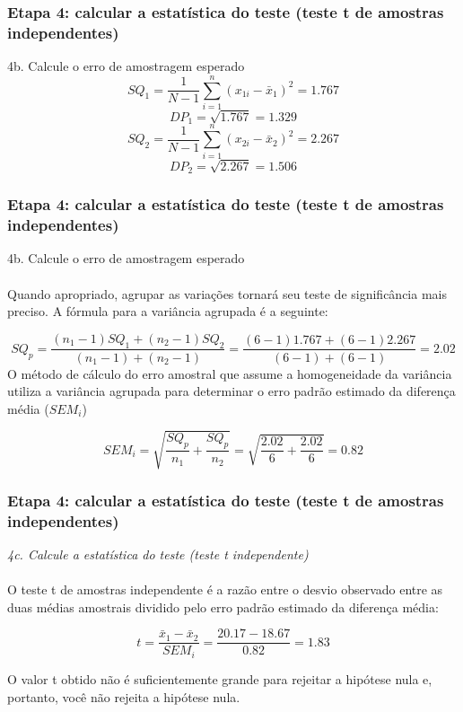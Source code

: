 \documentclass[11pt]{beamer}
\begin{document}
\begin{frame}
\frametitle{Etapa 4: calcular a estatística do teste (teste t de amostras independentes)}
4b. Calcule o erro de amostragem esperado
\[SQ_1 = \frac{1}{N-1}\sum_{i=1}^n(x_{1i} - \bar{x}_1)^2 = 1.767\]
\[DP_1 = \sqrt{1.767} = 1.329\]
\[SQ_2 = \frac{1}{N-1}\sum_{i=1}^n(x_{2i} - \bar{x}_2)^2 = 2.267\]
\[DP_2 = \sqrt{2.267} = 1.506\]

\end{frame}

\begin{frame}
\frametitle{Etapa 4: calcular a estatística do teste (teste t de amostras independentes)}
4b. Calcule o erro de amostragem esperado\\~\\
Quando apropriado, agrupar as variações tornará seu teste de significância mais preciso. A fórmula para a variância agrupada é a seguinte:

\[SQ_p = \frac{(n_1-1)SQ_1+(n_2-1)SQ_2}{(n_1-1)+(n_2-1)} = \frac{(6-1)1.767+(6-1)2.267}{(6-1)+(6-1)}=2.02\]
O método de cálculo do erro amostral que assume a homogeneidade da variância utiliza a variância agrupada para determinar o erro padrão estimado da diferença média ($SEM_i$)

\[SEM_i = \sqrt{\frac{SQ_p}{n_1}+\frac{SQ_p}{n_2}} = \sqrt{\frac{2.02}{6}+\frac{2.02}{6}} = 0.82\]

\end{frame}

\begin{frame}
\frametitle{Etapa 4: calcular a estatística do teste (teste t de amostras independentes)}

\textit{4c. Calcule a estatística do teste (teste t independente)}\\~\\

O teste t de amostras independente é a razão entre o desvio observado entre as duas médias amostrais dividido pelo erro padrão estimado da diferença média:

\[t = \frac{\bar{x}_1-\bar{x}_2}{SEM_i} =  \frac{20.17 - 18.67}{0.82} = 1.83\]

O valor t obtido não é suficientemente grande para rejeitar a hipótese nula e, portanto, você não rejeita a hipótese nula.

\end{frame}
\end{document}
